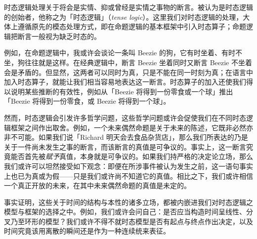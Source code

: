 \documentclass[../../../include/open-logic-section]{subfiles}
\begin{document}


时态逻辑处理关于将会是实情、抑或曾经是实情之事物的断言。被认为是时态逻辑的创始者，他称之为「时态逻辑」（\textit{tense logic}）。这里我们对时态逻辑的处理，大体上遵循原先的模态处理方式，即在命题逻辑的基本框架中引入时态算子；命题逻辑把断言一般视为缺乏时态的。

例如，在命题逻辑中，我或许会谈论一条叫 Beezie 的狗，它有时坐着、有时不坐，狗往往就是这样。在经典逻辑中，断言 Beezie 坐着同时又断言 Beezie 不坐着会是矛盾的。但显然，这两者可以同时为真，只是不能在同一时刻为真；在语言中加入时态算子，就能让我们相当容易地表达这一断言。时态算子的加入还使我们得以说明某些推断的有效性，例如从「Beezie 将得到一份零食或一个球」推出「Beezie 将得到一份零食，或 Beezie 将得到一个球」。

然而，时态逻辑会引发许多哲学问题，这些哲学问题或许会促使我们在不同时态逻辑框架之间作出取舍。例如，一个未来偶然命题是关于未来的陈述，它既非必然亦非不可能。如果我们说「Richard 明天会去食品杂货店」，那么我们所表达的乃是关于一件尚未发生之事的断言，而该断言的真值是可争议的。事实上，这一断言究竟能否首先被\emph{赋予}真值，本身就是可争议的。如果我们持严格的决定论立场，那么我们或许可以坦然接受如下观念：即便在所涉事件被认为发生之前，这一语句事实上也已为真或为假——只是我们或许尚不知道它的真值。相比之下，我们或许相信一个真正开放的未来，在其中未来偶然命题的真值是未定的。

事实证明，这些关于时间的结构与本性的诸多立场，都被内嵌进我们对时态逻辑之模型与框架的选择之中。例如，我们或许会问自己：是否应当构造时间呈线性、分叉乃至环形的模型？我们或许不得不就时态模型是否有起点与终点作出决定，以及时间究竟该用离散的瞬间还是作为一种连续统来表征。
\end{document}
